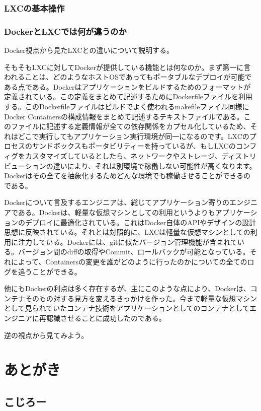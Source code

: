 \documentclass[9pt,b5paper,tombo]{jsbook}
\begin{document}
\subsection{LXCの基本操作}


\subsection{DockerとLXCでは何が違うのか}
Docker視点から見たLXCとの違いについて説明する。

そもそもLXCに対してDockerが提供している機能とは何なのか。まず第一に言われることは、どのようなホストOSであってもポータブルなデプロイが可能である点である。Dockerはアプリケーションをビルドするためのフォーマットが定義されている。この定義をまとめて記述するためにDockerfileファイルを利用する。このDockerfileファイルはビルドでよく使われるmakefileファイル同様にDocker Containersの構成情報をまとめて記述するテキストファイルである。このファイルに記述する定義情報が全ての依存関係をカプセル化しているため、それはどこで実行してもアプリケーション実行環境が同一になるのです。LXCのプロセスのサンドボックスもポータビリティーを持っているが、もしLXCのコンフィグをカスタマイズしているとしたら、ネットワークやストレージ、ディストリビューションの違いにより、それは別環境で稼働しない可能性が高くなります。Dockerはその全てを抽象化するためどんな環境でも稼働させることができるのである。

Dockerについて言及するエンジニアは、総じてアプリケーション寄りのエンジニアである。Dockerは、軽量な仮想マシンとしての利用というよりもアプリケーションのデプロイに最適化されている。これはDocker自体のAPIやデザインの設計思想に反映されている。それとは対照的に、LXCは軽量な仮想マシンとしての利用に注力している。Dockerには、gitに似たバージョン管理機能が含まれている。バージョン間のdiffの取得やCommit、ロールバックが可能となっている。それによって、Containersの変更を誰がどのように行ったのかについての全てのログを追うことができる。

他にもDockerの利点は多く存在するが、主にこのような点により、Dockerは、コンテナそのもの対する見方を変えるきっかけを作った。今まで軽量な仮想マシンとして見られていたコンテナ技術をアプリケーションとしてのコンテナとしてエンジニアに再認識させることに成功したのである。

逆の視点から見てみよう。

\chapter{あとがき}

\section{こじろー}
\end{document}
